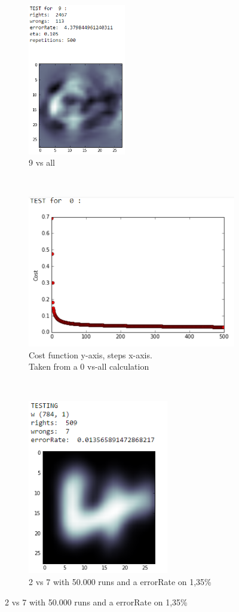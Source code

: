 \documentclass[paper=a4, fontsize=11pt]{scrartcl} %
\numberwithin{equation}{section} %
\numberwithin{figure}{section} %
\numberwithin{table}{section} %
\begin{document}
    \begin{figure}
		\begin{subfigure}[t]{0.32\textwidth}
			\centering
			\includegraphics[height=2.6in]{test9}
            \caption*{9 vs all}
		\end{subfigure}%
		~
        \captionsetup{justification=centering}
		\begin{subfigure}[t]{0.5\textwidth}
			\centering
			\includegraphics[height=2.6in]{costfun}
            \caption*{Cost function y-axis, steps x-axis. \\
            		  Taken from a 0 vs-all calculation}
		\end{subfigure}
        ~
		\begin{subfigure}[t]{\textwidth}
			\centering
			\includegraphics[height=3in]{2vs7}
            \caption*{2 vs 7 with 50.000 runs and a errorRate on 1,35\%}
		\end{subfigure}
	\end{figure}
    
\end{document}
